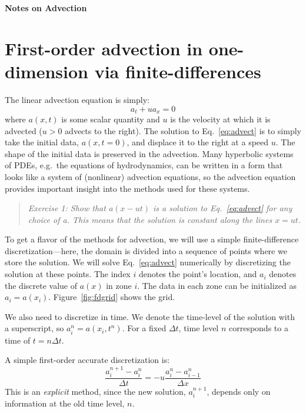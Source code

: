 \documentclass[11pt]{article}
\begin{document}
\begin{center}
{\LARGE \textsf{\textbf{
Notes on Advection}}
}
\end{center}

\begin{quote}
\end{quote}


\section{First-order advection in one-dimension via finite-differences}

The linear advection equation is simply:
\begin{equation}
\label{eq:advect}
a_t + u a_x = 0
\end{equation}
where $a(x,t)$ is some scalar quantity and $u$ is the velocity at
which it is advected ($u > 0$ advects to the right).  The solution to
Eq.~\ref{eq:advect} is to simply take the initial data, $a(x,t=0)$,
and displace it to the right at a speed $u$.  The shape of the initial
data is preserved in the advection.  Many hyperbolic systems of PDEs,
e.g.\ the equations of hydrodynamics, can be written in a form that
looks like a system of (nonlinear) advection equations, so the
advection equation provides important insight into the methods used
for these systems.
%
\begin{quote}
{\em Exercise 1: Show that $a(x - ut)$ is a solution to
  Eq.~\ref{eq:advect} for any choice of a.  This means that
the solution is constant along the lines $x = u t$.}
\end{quote}

To get a flavor of the methods for advection, we will use a simple
finite-difference discretization---here, the domain is divided into
a sequence of points where we store the solution.
We will solve
Eq.~\ref{eq:advect} numerically by discretizing the solution at
these points.  The index $i$ denotes the point's location, and $a_i$
denotes the discrete value of $a(x)$ in zone $i$.  The data in each
zone can be initialized as $a_i = a(x_i)$.  Figure~\ref{fig:fdgrid}
shows the grid.

We also need to discretize in time.  We denote the time-level of the
solution with a superscript, so $a_i^n = a(x_i,t^n)$.  For a fixed
$\Delta t$, time level $n$ corresponds to a time of $t = n\Delta t$.


A simple first-order accurate discretization is:
\begin{equation}
\frac{a_i^{n+1} - a_i^n}{\Delta t} = - u \frac{a_i^n - a_{i-1}^n}{\Delta x}
\label{eq:fo}
\end{equation}
This is an {\em explicit} method, since the new solution, $a_i^{n+1}$,
depends only on information at the old time level, $n$.  
\end{document}
